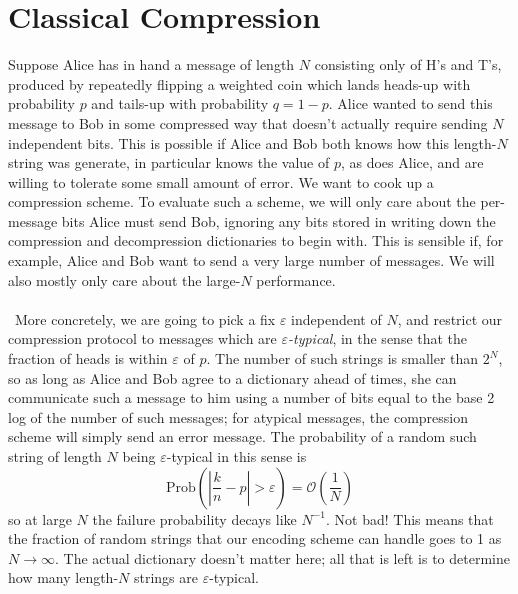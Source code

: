 \documentclass[11pt,letterpaper]{article}
\newcommand{\LP}{\left(}
\newcommand{\RP}{\right)}
\newcommand{\mc}[1]{\mathcal{#1}}
\begin{document}
\section{Classical Compression}
Suppose Alice has in hand a message of length $N$ consisting only of H's and T's, produced by repeatedly flipping a weighted coin which lands heads-up with probability $p$ and tails-up with probability $q = 1- p$. Alice wanted to send this message to Bob in some compressed way that doesn't actually require sending $N$ independent bits. This is possible if Alice and Bob both knows how this length-$N$ string was generate, in particular knows the value of $p$, as does Alice, and are willing to tolerate some small amount of error. We want to cook up a compression scheme. To evaluate such a scheme, we will only care about the per-message bits Alice must send Bob, ignoring any bits stored in writing down the compression and decompression dictionaries to begin with. This is sensible if, for example, Alice and Bob want to send a very large number of messages. We will also mostly only care about the large-$N$ performance. \\
\\
\
More concretely, we are going to pick a fix $\varepsilon$ independent of $N$, and restrict our compression protocol to messages which are \textit{$\varepsilon$-typical}, in the sense that the fraction of heads is within $\varepsilon$ of $p$. The number of such strings is smaller than $2^N$, so as long as Alice and Bob agree to a dictionary ahead of times, she can communicate such a message to him using a number of bits equal to the base 2 log of the number of such messages; for atypical messages, the compression scheme will simply send an error message. The probability of a random such string of length $N$ being $\varepsilon$-typical in this sense is \begin{equation}
\mbox{Prob} \LP \left| \frac{k}{n} - p \right| > \varepsilon \RP = \mc{O} \LP \frac{1}{N} \RP
\end{equation}
so at large $N$ the failure probability decays like $N^{-1}$. Not bad! This means that the fraction of random strings that our encoding scheme can handle goes to 1 as $N \to \infty$. The actual dictionary doesn't matter here; all that is left is to determine how many length-$N$ strings are $\varepsilon$-typical.
\end{document}
